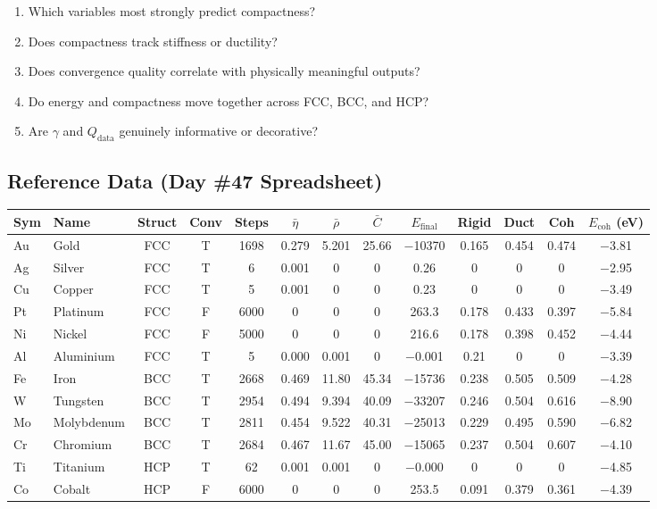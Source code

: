 \documentclass[11pt]{article}
\newcommand{\var}[1]{\ensuremath{\mathrm{#1}}}
\begin{document}
\begin{enumerate}[noitemsep]
  \item Which variables most strongly predict compactness?
  \item Does compactness track stiffness or ductility?
  \item Does convergence quality correlate with physically meaningful outputs?
  \item Do energy and compactness move together across FCC, BCC, and HCP?
  \item Are $\gamma$ and $Q_\var{data}$ genuinely informative or decorative?
\end{enumerate}

\subsection{Reference Data (Day \#47 Spreadsheet)}

\begin{center}
\renewcommand{\arraystretch}{1.1}
\scriptsize
\begin{tabular}{llccccccccccc}
\toprule
Sym & Name & Struct & Conv & Steps & $\bar{\eta}$ & $\bar{\rho}$ &
$\bar{C}$ & $E_\mathrm{final}$ & Rigid & Duct & Coh &
$E_\mathrm{coh}$ (eV) \\
\midrule
Au & Gold       & FCC & T & 1698 & 0.279 & 5.201 & 25.66 & $-$10370 & 0.165 & 0.454 & 0.474 & $-$3.81 \\
Ag & Silver     & FCC & T &    6 & 0.001 & 0     & 0     & 0.26     & 0     & 0     & 0     & $-$2.95 \\
Cu & Copper     & FCC & T &    5 & 0.001 & 0     & 0     & 0.23     & 0     & 0     & 0     & $-$3.49 \\
Pt & Platinum   & FCC & F & 6000 & 0     & 0     & 0     & 263.3    & 0.178 & 0.433 & 0.397 & $-$5.84 \\
Ni & Nickel     & FCC & F & 5000 & 0     & 0     & 0     & 216.6    & 0.178 & 0.398 & 0.452 & $-$4.44 \\
Al & Aluminium  & FCC & T &    5 & 0.000 & 0.001 & 0     & $-$0.001 & 0.21  & 0     & 0     & $-$3.39 \\
\addlinespace
Fe & Iron       & BCC & T & 2668 & 0.469 & 11.80 & 45.34 & $-$15736 & 0.238 & 0.505 & 0.509 & $-$4.28 \\
W  & Tungsten   & BCC & T & 2954 & 0.494 & 9.394 & 40.09 & $-$33207 & 0.246 & 0.504 & 0.616 & $-$8.90 \\
Mo & Molybdenum & BCC & T & 2811 & 0.454 & 9.522 & 40.31 & $-$25013 & 0.229 & 0.495 & 0.590 & $-$6.82 \\
Cr & Chromium   & BCC & T & 2684 & 0.467 & 11.67 & 45.00 & $-$15065 & 0.237 & 0.504 & 0.607 & $-$4.10 \\
\addlinespace
Ti & Titanium   & HCP & T &   62 & 0.001 & 0.001 & 0     & $-$0.000 & 0     & 0     & 0     & $-$4.85 \\
Co & Cobalt     & HCP & F & 6000 & 0     & 0     & 0     & 253.5    & 0.091 & 0.379 & 0.361 & $-$4.39 \\
\bottomrule
\end{tabular}
\end{center}
\end{document}
